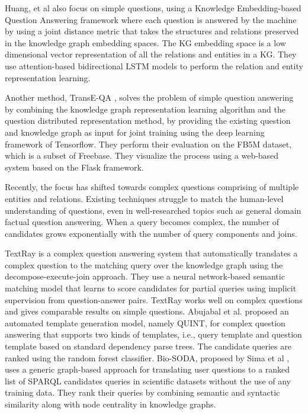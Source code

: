 Huang, et al \cite{10.1145/3289600.3290956} also focus on simple questions, using a Knowledge Embedding-based Question Answering framework where each question is answered by the machine by using a joint distance metric that takes the structures and relations preserved in the knowledge graph embedding spaces. The KG embedding space is a low dimensional vector representation of all the relations and entities in a KG. They use attention-based bidirectional LSTM models to perform the relation
and entity representation learning.

Another method, TransE-QA \cite{10.1145/3390557.3394296}, solves the problem of simple question answering by combining the knowledge graph representation learning algorithm and the question distributed representation method, by providing the existing question and knowledge graph as input for joint training using the deep learning framework of Tensorflow. They perform their evaluation on the FB5M dataset, which is a subset of Freebase. They visualize the process using a web-based system based on the Flask framework.

Recently, the focus has shifted towards complex questions comprising of multiple entities and relations.
Existing techniques struggle to match the human-level understanding of questions, even in well-researched topics such as general domain factual question answering. When a query becomes complex, the number of candidates grows exponentially with the number of query components and joins. 

TextRay \cite{textray} is a complex question answering system that automatically translates a complex question to the matching query over the knowledge graph using the decompose-execute-join approach. They use a neural network-based semantic matching model that learns to score candidates for partial queries using implicit supervision from question-answer pairs. TextRay works well on complex questions and gives comparable results on simple questions. Abujabal et al. \cite{10.1145/3038912.3052583} proposed an automated template generation model, namely QUINT, for complex question answering that supports two kinds of templates, i.e., query template and question template based on standard dependency parse trees. The candidate queries are ranked using the random forest classifier. Bio-SODA, proposed by Sima et al  \cite{10.1145/3468791.3469119}, uses a generic graph-based approach for translating user questions to a ranked list of SPARQL candidates queries in scientific datasets without the use of any training data. They rank their queries by combining semantic and syntactic similarity along with node centrality in knowledge graphs.

